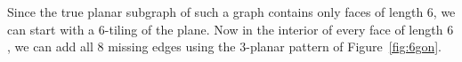





Since the true planar subgraph of such a graph contains only faces of length $6$, we can start with a $6$-tiling of the plane. Now in the interior of every face of length $6$, we can add all  $8$ missing edges using the $3$-planar pattern of Figure~\ref{fig:6gon}.
%


